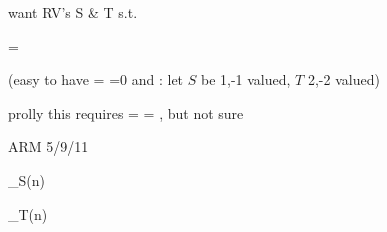 want RV's S & T s.t.

 \neq {}
 = 

(easy to have  = =0 and  \neq
{}: let $S$ be 1,-1 valued, $T$ 2,-2 valued)


prolly this requires  =  = \infty, but not
sure

ARM 5/9/11


\pdf_S(n) \eqdef

\pdf_T(n) \eqdef
